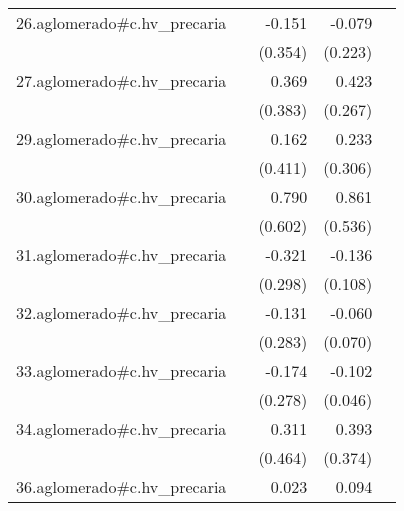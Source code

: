 {\begin{longtable}{l*{4}{D{.}{.}{-1}}}
\addlinespace
26.aglomerado#c.hv\_precaria&                     &      -0.151         &      -0.079         &                     \\
            &                     &     (0.354)         &     (0.223)         &                     \\
\addlinespace
27.aglomerado#c.hv\_precaria&                     &       0.369         &       0.423         &                     \\
            &                     &     (0.383)         &     (0.267)         &                     \\
\addlinespace
29.aglomerado#c.hv\_precaria&                     &       0.162         &       0.233         &                     \\
            &                     &     (0.411)         &     (0.306)         &                     \\
\addlinespace
30.aglomerado#c.hv\_precaria&                     &       0.790         &       0.861         &                     \\
            &                     &     (0.602)         &     (0.536)         &                     \\
\addlinespace
31.aglomerado#c.hv\_precaria&                     &      -0.321         &      -0.136         &                     \\
            &                     &     (0.298)         &     (0.108)         &                     \\
\addlinespace
32.aglomerado#c.hv\_precaria&                     &      -0.131         &      -0.060         &                     \\
            &                     &     (0.283)         &     (0.070)         &                     \\
\addlinespace
33.aglomerado#c.hv\_precaria&                     &      -0.174         &      -0.102\sym{*}  &                     \\
            &                     &     (0.278)         &     (0.046)         &                     \\
\addlinespace
34.aglomerado#c.hv\_precaria&                     &       0.311         &       0.393         &                     \\
            &                     &     (0.464)         &     (0.374)         &                     \\
\addlinespace
36.aglomerado#c.hv\_precaria&                     &       0.023         &       0.094         &                     \\

\end{longtable}}

